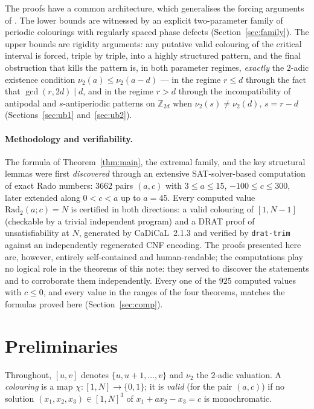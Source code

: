 \documentclass[11pt]{article}
\theoremstyle{remark}
\theoremstyle{definition}
\newcommand{\Rad}{\mathrm{Rad}_2}
\newcommand{\vtwo}{\nu_2}
\begin{document}
The proofs have a common architecture, which generalises the forcing
arguments of \cite{DT2020}. The lower bounds are witnessed by an explicit
two-parameter family of periodic colourings with regularly spaced phase
defects (Section~\ref{sec:family}). The upper bounds are rigidity arguments:
any putative valid colouring of the critical interval is forced, triple by
triple, into a highly structured pattern, and the final obstruction that
kills the pattern is, in both parameter regimes, \emph{exactly} the $2$-adic
existence condition $\vtwo(a) \le \vtwo(a-d)$ --- in the regime $r \le d$
through the fact that $\gcd(r, 2d) \mid d$, and in the regime $r > d$
through the incompatibility of antipodal and $s$-antiperiodic patterns on
$\mathbb{Z}_{2d}$ when $\vtwo(s) \ne \vtwo(d)$, $s = r-d$
(Sections~\ref{sec:ub1} and~\ref{sec:ub2}).

\paragraph{Methodology and verifiability.}
The formula of Theorem~\ref{thm:main}, the extremal family, and the key
structural lemmas were first \emph{discovered} through an extensive
SAT-solver-based computation of exact Rado numbers: $3662$ pairs $(a,c)$
with $3 \le a \le 15$, $-100 \le c \le 300$, later extended along $0 < c < a$
up to $a = 45$. Every computed value $\Rad(a;c) = N$ is certified in both
directions: a valid colouring of $[1,N-1]$ (checkable by a trivial
independent program) and a DRAT proof of unsatisfiability at $N$, generated
by CaDiCaL~2.1.3 \cite{cadical} and verified by \texttt{drat-trim} against an independently
regenerated CNF encoding. The proofs presented here are, however, entirely
self-contained and human-readable; the computations play no logical role in
the theorems of this note: they served to discover the statements and to
corroborate them independently. Every one of the $925$ computed values with
$c \le 0$, and every value in the ranges of the four theorems, matches the
formulas proved here (Section~\ref{sec:comp}).

\section{Preliminaries}\label{sec:prelim}

Throughout, $[u,v]$ denotes $\{u, u+1, \dots, v\}$ and $\vtwo$ the $2$-adic
valuation. A \emph{colouring} is a map $\chi\colon [1,N] \to \{0,1\}$; it is
\emph{valid} (for the pair $(a,c)$) if no solution
$(x_1,x_2,x_3) \in [1,N]^3$ of $x_1 + a x_2 - x_3 = c$ is monochromatic.
\end{document}

